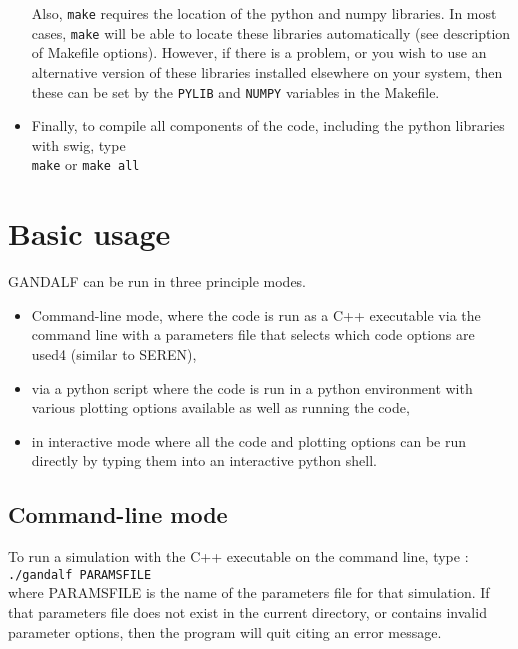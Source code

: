 \documentclass[a4paper]{article}
\newcommand{\var}[1]{\texttt{#1}}
\begin{document}
\begin{itemize}
Also, \var{make} requires the location of the python and numpy libraries.  In most cases, \var{make} will be able to locate these libraries automatically (see description of Makefile options).  However, if there is a problem, or you wish to use an alternative version of these libraries installed elsewhere on your system, then these can be set by the \var{PYLIB} and \var{NUMPY} variables in the Makefile.  


\item Finally, to compile all components of the code, including the python libraries with swig, type \\
\newline
\noindent \var{make} or \var{make all} \\

\end{itemize}



\section{Basic usage}
GANDALF can be run in three principle modes.  
\begin{itemize} 
\item Command-line mode, where the code is run as a C++ executable via the command line with a parameters file that selects which code options are used4 (similar to SEREN), 
\item via a python script where the code is run in a python environment with various plotting options available as well as running the code, 
\item in interactive mode where all the code and plotting options can be run directly by typing them into an interactive python shell.
\end{itemize}



\subsection{Command-line mode}

\noindent To run a simulation with the C++ executable on the command line, type : \\
\newline
\var{./gandalf PARAMSFILE} \\
\newline
where PARAMSFILE is the name of the parameters file for that simulation.  If that parameters file does not exist in the current directory, or contains invalid parameter options, then the program will quit citing an error message.
\end{document}
